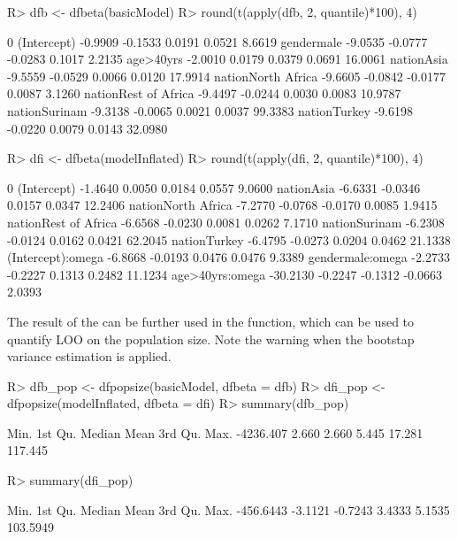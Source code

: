 \documentclass[
]{jss}
\newcommand{\1}{\mathcal{I}} \newcommand{\bZero}{\boldsymbol{0}}
\begin{document}
\begin{CodeChunk}
\begin{CodeInput}
R> dfb <- dfbeta(basicModel)
R> round(t(apply(dfb, 2, quantile)*100), 4)
\end{CodeInput}
\begin{CodeOutput}
                          0%
(Intercept)          -0.9909 -0.1533  0.0191 0.0521  8.6619
gendermale           -9.0535 -0.0777 -0.0283 0.1017  2.2135
age>40yrs            -2.0010  0.0179  0.0379 0.0691 16.0061
nationAsia           -9.5559 -0.0529  0.0066 0.0120 17.9914
nationNorth Africa   -9.6605 -0.0842 -0.0177 0.0087  3.1260
nationRest of Africa -9.4497 -0.0244  0.0030 0.0083 10.9787
nationSurinam        -9.3138 -0.0065  0.0021 0.0037 99.3383
nationTurkey         -9.6198 -0.0220  0.0079 0.0143 32.0980
\end{CodeOutput}
\end{CodeChunk}

\begin{CodeChunk}
\begin{CodeInput}
R> dfi <- dfbeta(modelInflated)
R> round(t(apply(dfi, 2, quantile)*100), 4)
\end{CodeInput}
\begin{CodeOutput}
                           0%
(Intercept)           -1.4640  0.0050  0.0184  0.0557  9.0600
nationAsia            -6.6331 -0.0346  0.0157  0.0347 12.2406
nationNorth Africa    -7.2770 -0.0768 -0.0170  0.0085  1.9415
nationRest of Africa  -6.6568 -0.0230  0.0081  0.0262  7.1710
nationSurinam         -6.2308 -0.0124  0.0162  0.0421 62.2045
nationTurkey          -6.4795 -0.0273  0.0204  0.0462 21.1338
(Intercept):omega     -6.8668 -0.0193  0.0476  0.0476  9.3389
gendermale:omega      -2.2733 -0.2227  0.1313  0.2482 11.1234
age>40yrs:omega      -30.2130 -0.2247 -0.1312 -0.0663  2.0393
\end{CodeOutput}
\end{CodeChunk}

The result of the  can be further used in the
 function, which can be used to quantify LOO on the
population size. Note the warning when the bootstap variance estimation
is applied.

\begin{CodeChunk}
\begin{CodeInput}
R> dfb_pop <- dfpopsize(basicModel, dfbeta = dfb)
R> dfi_pop <- dfpopsize(modelInflated, dfbeta = dfi)
R> summary(dfb_pop)
\end{CodeInput}
\begin{CodeOutput}
     Min.   1st Qu.    Median      Mean   3rd Qu.      Max. 
-4236.407     2.660     2.660     5.445    17.281   117.445 
\end{CodeOutput}
\begin{CodeInput}
R> summary(dfi_pop)
\end{CodeInput}
\begin{CodeOutput}
     Min.   1st Qu.    Median      Mean   3rd Qu.      Max. 
-456.6443   -3.1121   -0.7243    3.4333    5.1535  103.5949 
\end{CodeOutput}
\end{CodeChunk}
\end{document}
